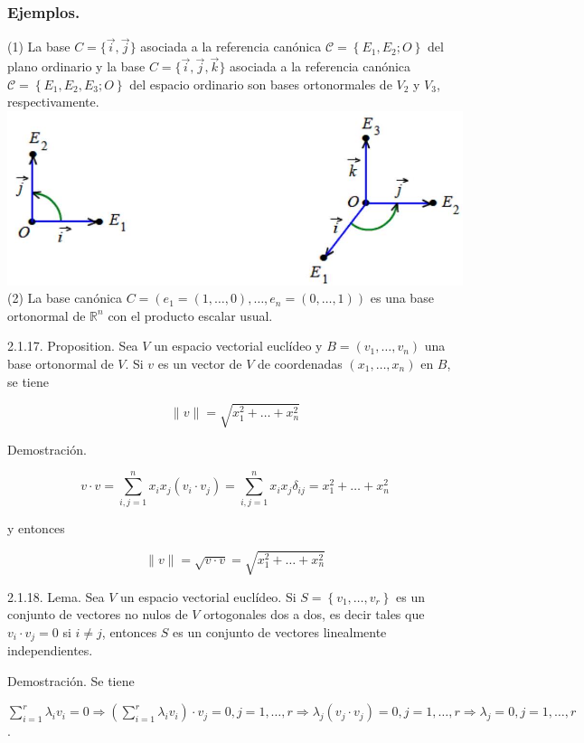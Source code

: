 \documentclass[12pt, a4paper, ones, notitlepage, openany,titlepage]{article}
\begin{document}
\subsubsection{Ejemplos.}
(1) La base $C=\{\vec{i}, \vec{j}\}$ asociada a la referencia canónica $\mathcal{C}=\left\{E_{1}, E_{2} ; O\right\}$ del plano ordinario y la base $C=\{\vec{i}, \vec{j}, \vec{k}\}$ asociada a la referencia canónica $\mathcal{C}=\left\{E_{1}, E_{2}, E_{3} ; O\right\}$ del espacio ordinario son bases ortonormales de $V_{2}$ y $V_{3}$, respectivamente.
\includegraphics[max width=\textwidth]{2023_03_20_c2fe6c117849a1a0e8afg-043}(2) La base canónica $C=\left(e_{1}=(1, \ldots, 0), \ldots, e_{n}=(0, \ldots, 1)\right)$ es una base ortonormal de $\mathbb{R}^{n}$ con el producto escalar usual.

2.1.17. Proposition. Sea $V$ un espacio vectorial euclídeo y $B=\left(v_{1}, \ldots, v_{n}\right)$ una base ortonormal de $V$. Si $v$ es un vector de $V$ de coordenadas $\left(x_{1}, \ldots, x_{n}\right)$ en $B$, se tiene

$$
\|v\|=\sqrt{x_{1}^{2}+\ldots+x_{n}^{2}}
$$

Demostración.

$$
v \cdot v=\sum_{i, j=1}^{n} x_{i} x_{j}\left(v_{i} \cdot v_{j}\right)=\sum_{i, j=1}^{n} x_{i} x_{j} \delta_{i j}=x_{1}^{2}+\ldots+x_{n}^{2}
$$

y entonces

$$
\|v\|=\sqrt{v \cdot v}=\sqrt{x_{1}^{2}+\ldots+x_{n}^{2}}
$$

2.1.18. Lema. Sea $V$ un espacio vectorial euclídeo. Si $S=\left\{v_{1}, \ldots, v_{r}\right\}$ es un conjunto de vectores no nulos de $V$ ortogonales dos a dos, es decir tales que $v_{i} \cdot v_{j}=0$ si $i \neq j$, entonces $S$ es un conjunto de vectores linealmente independientes.

Demostración. Se tiene

$\sum_{i=1}^{r} \lambda_{i} v_{i}=0 \Rightarrow\left(\sum_{i=1}^{r} \lambda_{i} v_{i}\right) \cdot v_{j}=0, j=1, \ldots, r \Rightarrow \lambda_{j}\left(v_{j} \cdot v_{j}\right)=0, j=1, \ldots, r \Rightarrow \lambda_{j}=0, j=1, \ldots, r$.
\end{document}

